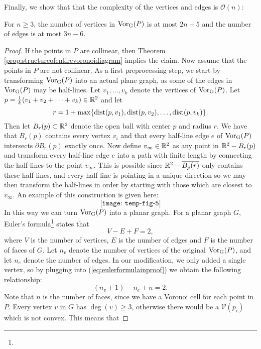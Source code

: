 Finally, we show that that the complexity of the vertices and edges is $\mathcal{O}(n)$:
\begin{thm} \label{thm:numberofvertsandedges}
For $n \geq 3$, the number of vertices in $\operatorname{Vor_{G}}(P)$ is at most $2n - 5$ and the number of edges is at most $3n - 6$.
\end{thm}
\begin{proof}
If the points in $P$ are collinear, then Theorem \ref{prop:structureofentirevoronoidiagram} implies the claim. Now assume that the points in $P$ are not collinear. As a first preprocessing step, we start by transforming $\operatorname{Vor_{G}}(P)$ into an actual plane graph, as some of the edges in $\operatorname{Vor_{G}}(P)$ may be half-lines. Let $v_1, \ldots, v_k$ denote the vertices of $\operatorname{Vor_{G}}(P)$. Let $p = \tfrac{1}{k}(v_1 + v_2 + \cdots + v_k) \in \mathbb{R}^2$ and let
\[
    r = 1 + \max\{\operatorname{dist}(p, v_1), \operatorname{dist}(p, v_2), \ldots, \operatorname{dist}(p, v_k)\}.
\]
Then let $B_r(p) \subset \mathbb{R}^2$ denote the open ball with center $p$ and radius $r$. We have that $B_r(p)$ contains every vertex $v_i$ and that every half-line edge $e$ of $\operatorname{Vor_{G}}(P)$ intersects $\partial B_r(p)$ exactly once. Now define $v_{\infty} \in \mathbb{R}^2$ as any point in $\mathbb{R}^2 - B_r(p)$ and transform every half-line edge $e$ into a path with finite length by connecting the half-lines to the point $v_{\infty}$. This is possible since $\mathbb{R}^2 - \overline{B_p(r)}$ only contains these half-lines, and every half-line is pointing in a unique direction so we may then transform the half-lines in order by starting with those which are closest to $v_{\infty}$. An example of this construction is given here:
\[
    \texttt{[image: temp-fig-5]}
\]
In this way we can turn $\operatorname{Vor_{G}}(P)$ into a planar graph. For a planar graph $G$, Euler's formula\footnote{} states that
\begin{equation} \label{eq:eulerformulainproof}
    V - E + F = 2,
\end{equation}
where $V$ is the number of vertices, $E$ is the number of edges and $F$ is the number of faces of $G$. Let $n_v$ denote the number of vertices of the original $\operatorname{Vor_{G}}(P)$, and let $n_e$ denote the number of edges. In our modification, we only added a single vertex, so by plugging into (\ref{eq:eulerformulainproof}) we obtain the following relationship:
\begin{equation} \label{eq:eulersformulaapplied}
    (n_v + 1) - n_e + n = 2.
\end{equation}
Note that $n$ is the number of faces, since we have a Voronoi cell for each point in $P$. Every vertex $v$ in $G$ has $\deg(v) \geq 3$, otherwise there would be a $\mathcal{V}(p_i)$ which is not convex. This means that

\end{proof}
